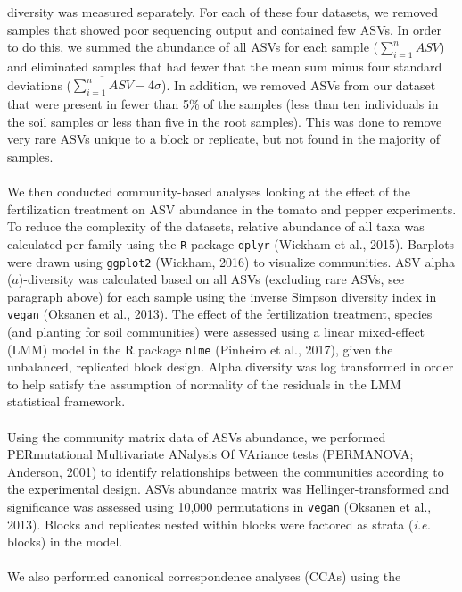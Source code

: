 \documentclass[11pt,]{article}
\begin{document}
diversity was measured separately. For each of these four datasets, we
removed samples that showed poor sequencing output and contained few
ASVs. In order to do this, we summed the abundance of all ASVs for each
sample (\(\sum_{i=1}^n ASV\)) and eliminated samples that had fewer that
the mean sum minus four standard deviations
(\(\overline{\sum_{i=1}^n ASV} - 4\sigma\)). In addition, we removed
ASVs from our dataset that were present in fewer than 5\% of the samples
(less than ten individuals in the soil samples or less than five in the
root samples). This was done to remove very rare ASVs unique to a block
or replicate, but not found in the majority of samples.\\
\hspace*{0.333em}\\
We then conducted community-based analyses looking at the effect of the
fertilization treatment on ASV abundance in the tomato and pepper
experiments. To reduce the complexity of the datasets, relative
abundance of all taxa was calculated per family using the \texttt{R}
package \texttt{dplyr} (Wickham et al., 2015). Barplots were drawn using
\texttt{ggplot2} (Wickham, 2016) to visualize communities. ASV alpha
(\(a\))-diversity was calculated based on all ASVs (excluding rare ASVs,
see paragraph above) for each sample using the inverse Simpson diversity
index in \texttt{vegan} (Oksanen et al., 2013). The effect of the
fertilization treatment, species (and planting for soil communities)
were assessed using a linear mixed-effect (LMM) model in the R package
\texttt{nlme} (Pinheiro et al., 2017), given the unbalanced, replicated
block design. Alpha diversity was log transformed in order to help
satisfy the assumption of normality of the residuals in the LMM
statistical framework.\\
\hspace*{0.333em}\\
Using the community matrix data of ASVs abundance, we performed
PERmutational Multivariate ANalysis Of VAriance tests (PERMANOVA;
Anderson, 2001) to identify relationships between the communities
according to the experimental design. ASVs abundance matrix was
Hellinger-transformed and significance was assessed using 10,000
permutations in \texttt{vegan} (Oksanen et al., 2013). Blocks and
replicates nested within blocks were factored as strata (\emph{i.e.}
blocks) in the model.\\
\hspace*{0.333em}\\
We also performed canonical correspondence analyses (CCAs) using the
\end{document}
